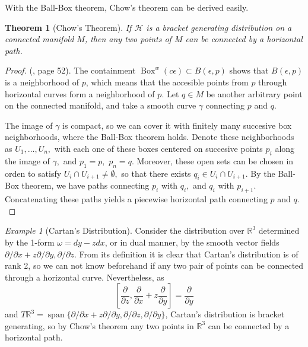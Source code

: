\documentclass[12pt, letterpaper, reqno]{amsart}
\theoremstyle{definition}
\theoremstyle{plain}
\newtheorem{thm}{Theorem}
\theoremstyle{remark}
\newtheorem{ex}{Example}
\begin{document}
With the Ball-Box theorem, Chow's theorem can be derived easily.

\begin{thm}[Chow's Theorem]
	If $ \mathcal{H} $ is a bracket generating distribution on a connected manifold $ M $, then any two points of $ M $ can be connected by a horizontal path.
\end{thm}
\begin{proof} (\cite{montgomery2002tour}, page 52). The containment $ \operatorname{Box}^w(c\epsilon) \subset B(\epsilon,p)$ shows that $ B(\epsilon, p) $ is a neighborhood of $ p $, which means that the accesible points from $ p $ through horizontal curves form a neighborhood of $ p. $ Let $ q\in M $ be another arbitrary point on the connected manifold, and take a smooth curve $ \gamma $ connecting $ p $ and $ q. $  

	The image of $ \gamma $ is compact, so we can cover it with finitely many succesive box neighborhoods, where the Ball-Box theorem holds. Denote these neighborhoods as $ U_1,\dots,U_n, $ with each one of these boxes centered on succesive points $ p_i $ along the image of $ \gamma, $ and $ p_1=p, $ $ p_n=q. $ Moreover, these open sets can be chosen in orden to satisfy $ U_i\cap U_{i+1}\neq\emptyset, $ so that there exists $ q_i \in U_i\cap U_{i+1}. $ By the Ball-Box theorem, we have paths connecting $ p_i $ with $ q_i, $ and $ q_i $ with $ p_{i+1}. $ Concatenating these paths yields a piecewise horizontal path connecting $ p $ and $ q. $ 
	
\end{proof}
\begin{ex}[Cartan's Distribution]
	Consider the distribution over $ \mathbb{R}^3 $ determined by the 1-form $\omega =dy- zdx $, or in dual manner, by the smooth vector fields $ \partial /\partial x + z \partial / \partial y, \partial/\partial z. $ From its definition it is clear that Cartan's distribution is of rank 2, so we can not know beforehand if any two pair of points can be connected through a horizontal curve. Nevertheless, as 
	$$ \left[ \frac{\partial}{\partial z}, \frac{\partial}{\partial x}+z \frac{\partial}{\partial y}    \right] = \frac{\partial}{\partial y}  $$ 
and $ T \mathbb{R}^3 = \operatorname{span}\{  \partial/\partial x + z \partial / \partial y, \partial/\partial z, \partial/\partial y\} $, Cartan's distribution is bracket generating, so by Chow's theorem any two points in $ \mathbb{R}^3 $ can be connected by a horizontal path. 
\end{ex}
\end{document}
